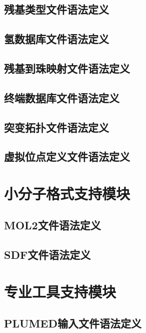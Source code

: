 \subsection{残基类型文件语法定义}


\subsection{氢数据库文件语法定义}


\subsection{残基到珠映射文件语法定义}


\subsection{终端数据库文件语法定义}


\subsection{突变拓扑文件语法定义}


\subsection{虚拟位点定义文件语法定义}


\section{小分子格式支持模块}
\subsection{MOL2文件语法定义}


\subsection{SDF文件语法定义}


\section{专业工具支持模块}
\subsection{PLUMED输入文件语法定义}
